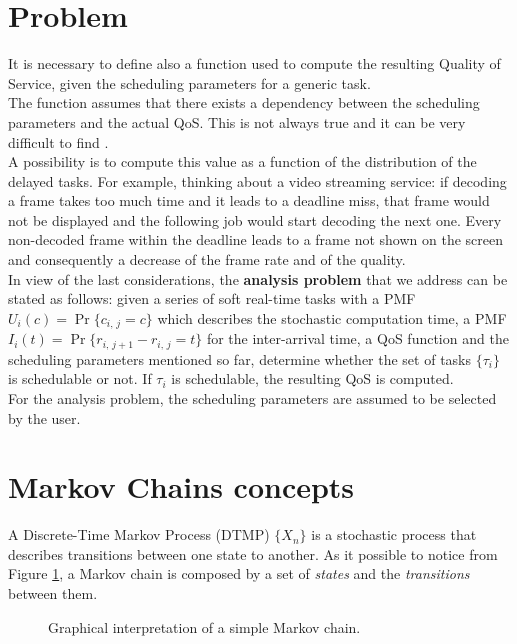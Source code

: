\section{Problem} \label{problem}
It is necessary to define also a function used to compute the resulting Quality of Service, given the scheduling parameters for a generic task.\\
The function assumes that there exists a dependency between the scheduling parameters and the actual QoS. This is not always true and it can be very difficult to find \cite{prosit}.\\
A possibility is to compute this value as a function of the distribution of the delayed tasks. For example, thinking about a video streaming service: if decoding a frame takes too much time and it leads to a deadline miss, that frame would not be displayed and the following job would start decoding the next one. Every non-decoded frame within the deadline leads to a frame not shown on the screen and consequently a decrease of the frame rate and of the quality.\\
In view of the last considerations, the \textbf{analysis problem} that we address can be stated as follows: given a series of soft real-time tasks with a PMF \( U_{i}(c) = \Pr\{c_{i,\,j} = c\} \) which describes the stochastic computation time, a PMF \( I_{i}(t) = \Pr\{r_{i,\,j+1}-r_{i,\,j} = t\} \) for the inter-arrival time, a QoS function and the scheduling parameters mentioned so far, determine whether the set of tasks \( \{\tau_{i}\} \) is schedulable or not. If \( \tau_{i} \) is schedulable, the resulting QoS is computed.\\
For the analysis problem, the scheduling parameters are assumed to be selected by the user.

\section{Markov Chains concepts} \label{mcconcepts}
A Discrete-Time Markov Process (DTMP) \( \{X_{n}\} \) is a stochastic process that describes transitions between one state to another. As it possible to notice from Figure \ref{automaton}, a Markov chain is composed by a set of \emph{states} and the \emph{transitions} between them.
\begin{figure}[H]
  \caption{Graphical interpretation of a simple Markov chain.}
  \label{automaton}
\end{figure}

